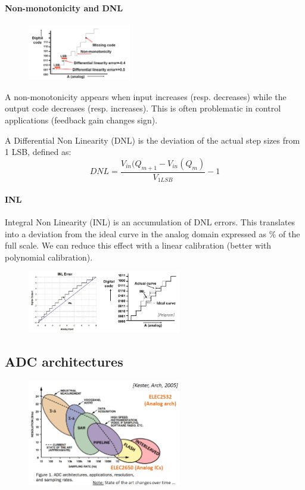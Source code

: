 \paragraph{Non-monotonicity and DNL}

\begin{figure}
    \centering
    \includegraphics[width =  0.4\textwidth]{L5/img/DNL.PNG}
\end{figure}

A non-monotonicity appears when input increases (resp. decreases)
while the output code decreases (resp. increases). This is often problematic in control applications
(feedback gain changes sign).

A Differential Non Linearity (DNL) is the deviation of the actual step sizes from 1 LSB, defined as:
$$ DNL = \frac{V_{in}(Q_{m+1} - V_{in}(Q_m)}{V_{1LSB}} -1 $$

\paragraph{INL}
Integral Non Linearity (INL) is an accumulation of DNL errors. This translates into a deviation from the ideal curve in the analog domain expressed as \% of the full scale. We can reduce this effect with a linear calibration (better with polynomial calibration).

\begin{figure}[H]
    \centering
    \includegraphics[width =  0.6\textwidth]{L5/img/INL.PNG}
\end{figure}


\subsection{ADC architectures}

\begin{figure}[H]
    \centering
    \includegraphics[width =  0.6\textwidth]{L5/img/architectures.PNG}
\end{figure}

